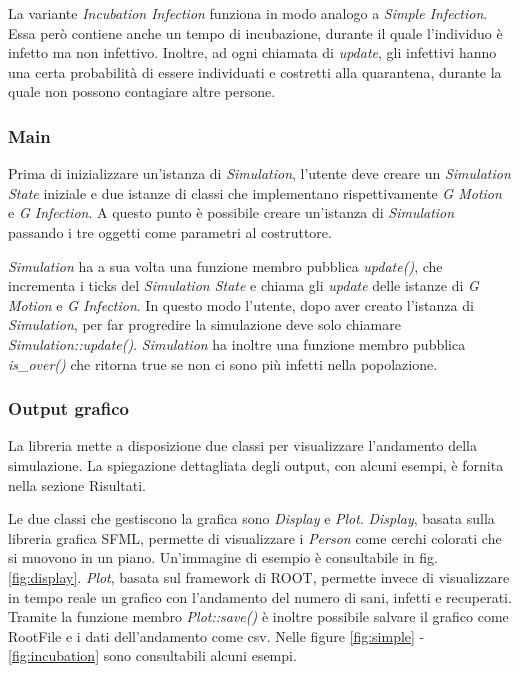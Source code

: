 \documentclass[a4paper,10pt,twocolumn]{article}
\begin{document}
La variante \emph{Incubation Infection} funziona in modo analogo a \emph{Simple Infection}. Essa però contiene anche un tempo di incubazione, durante il quale l'individuo è infetto ma non infettivo. Inoltre, ad ogni chiamata di \emph{update}, gli infettivi hanno una certa probabilità di essere individuati e costretti alla quarantena, durante la quale non possono contagiare altre persone.

\subsubsection*{Main}
Prima di inizializzare un’istanza di \emph{Simulation}, l’utente deve creare un \emph{Simulation State} iniziale e due istanze di classi che implementano rispettivamente \emph{G Motion} e \emph{G Infection}. A questo punto è possibile creare un’istanza di \emph{Simulation} passando i tre oggetti come parametri al costruttore.

\emph{Simulation} ha a sua volta una funzione membro pubblica \emph{update()}, che incrementa i ticks del \emph{Simulation State} e chiama gli \emph{update} delle istanze di \emph{G Motion} e \emph{G Infection}. In questo modo l’utente, dopo aver creato l’istanza di \emph{Simulation}, per far progredire la simulazione deve solo chiamare \emph{Simulation::update()}.
\emph{Simulation} ha inoltre una funzione membro pubblica \emph{is\_over()} che ritorna true se non ci sono più infetti nella popolazione.

\subsubsection*{Output grafico}
La libreria mette a disposizione due classi per visualizzare l’andamento della simulazione. La spiegazione dettagliata degli output, con alcuni esempi, è fornita nella sezione Risultati.

Le due classi che gestiscono la grafica sono \emph{Display} e \emph{Plot}. \emph{Display}, basata sulla libreria grafica SFML, permette di visualizzare i \emph{Person} come cerchi colorati che si muovono in un piano. Un'immagine di esempio è consultabile in fig. \ref{fig:display}. \emph{Plot}, basata sul framework di ROOT, permette invece di visualizzare in tempo reale un grafico con l’andamento del numero di sani, infetti e recuperati. Tramite la funzione membro \emph{Plot::save()} è inoltre possibile salvare il grafico come RootFile e i dati dell’andamento come csv. Nelle figure \ref{fig:simple} - \ref{fig:incubation} sono consultabili alcuni esempi.
\end{document}
